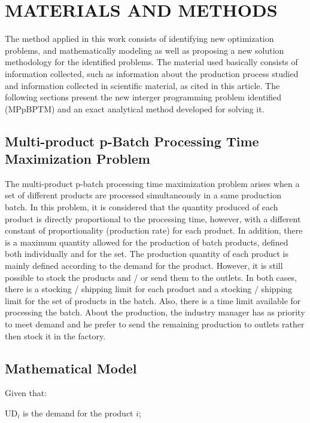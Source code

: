 \documentclass[10pt,fleqn,a4paper,twoside]{article}
\begin{document}
\section{MATERIALS AND METHODS}

The method applied in this work consists of identifying new optimization problems, and mathematically modeling as well as proposing a new solution methodology for the identified problems. The material used basically consists of information collected, such as information about the production process studied and information collected in scientific material, as cited in this article. The following sections present the new interger programming problem identified (MPpBPTM) and an exact analytical method developed for solving it.

\subsection{Multi-product p-Batch Processing Time Maximization Problem}
\label{sec:MBPTMP}

The multi-product p-batch processing time maximization problem arises when a set of different products are processed simultaneously in a same production batch. In this problem, it is considered that the quantity produced of each product is directly proportional to the processing time, however, with a different constant of proportionality (production rate) for each product. In addition, there is a maximum quantity allowed for the production of batch products, defined both individually and for the set. The production quantity of each product is mainly defined according to the demand for the product. However, it is still possible to stock the products and / or send them to the outlets. In both cases, there is a stocking / shipping limit for each product and a stocking / shipping limit for the set of products in the batch. Also, there is a time limit available for processing the batch. About the production, the industry manager has as priority to meet demand and he prefer to send the remaining production to outlets rather then stock it in the factory. 

\subsection{Mathematical Model}
\label{sec:mathModel}

Given that:

$\textrm{UD}_i$ is the demand for the product $i$;
\end{document}
